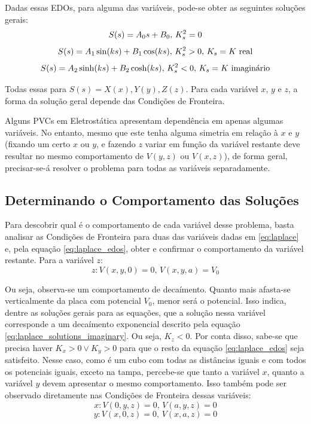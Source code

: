 \documentclass{report}
\begin{document}
Dadas essas EDOs, para alguma das variáveis, pode-se obter as seguintes soluções gerais:
\begin{equation}
    \label{eq:laplace_solutions_degenerates}
    \centering
    S(s) = A_0s + B_0,\, K_s^2 = 0
\end{equation}
\begin{equation}
    \label{eq:laplace_solutions_real}
    \centering
    S(s) = A_1\sin(ks) + B_1\cos(ks),\, K_s^2 > 0,\, K_s = K \text{ real}
\end{equation}
\begin{equation}
    \label{eq:laplace_solutions_imaginary}
    \centering
    S(s) = A_2\sinh(ks) + B_2\cosh(ks),\, K_s^2 < 0,\, K_s = K \text{ imaginário}
\end{equation}

Todas essas para $ S(s) = X(x), Y(y), Z(z) $. Para cada variável $ x $, $ y $ e $ z $, a
forma da solução geral depende das Condições de Fronteira.

Alguns PVCs em Eletrostática apresentam dependência em apenas algumas variáveis. No entanto,
mesmo que este tenha alguma simetria em relação à $ x $ e $ y $ (fixando um certo $ x $ ou $ y $,
e fazendo $ z $ variar em função da variável restante deve resultar no mesmo comportamento de $ V(y,z) $
ou $ V(x,z) $), de forma geral, precisar-se-á resolver o problema para todas as variáveis separadamente.

\subsection{Determinando o Comportamento das Soluções}

Para descobrir qual é o comportamento de cada variável desse problema, basta analisar as Condições de Fronteira
para duas das variáveis dadas em \ref{eq:laplace} e, pela equação \ref{eq:laplace_edos}, obter e confirmar o
comportamento da variável restante.
Para a variável $ z $:
$$ z: V(x, y, 0) = 0,\, V(x, y, a) = V_0 $$

Ou seja, observa-se um comportamento de decaímento. Quanto mais afasta-se verticalmente da placa com potencial $ V_0 $,
menor será o potencial. Isso indica, dentre as soluções gerais para as equações, que a solução nessa variável corresponde
a um decaímento exponencial descrito pela equação \ref{eq:laplace_solutions_imaginary}. Ou seja, $ K_z < 0 $. Por conta
disso, sabe-se que precisa haver $ K_x > 0 \lor K_y > 0 $ para que o resto da equação \ref{eq:laplace_edos} seja satisfeito.
Nesse caso, como é um cubo com todas as distâncias iguais e com todos os potenciais iguais, exceto na tampa, percebe-se que tanto
a variável $ x $, quanto a variável $ y $ devem apresentar o mesmo comportamento. Isso também pode ser observado diretamente nas
Condições de Fronteira dessas variáveis:
$$ x: V(0, y, z) = 0,\, V(a, y, z) = 0 $$
$$ y: V(x, 0, z) = 0,\, V(x, a, z) = 0 $$
\end{document}
